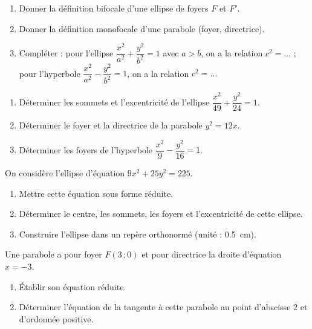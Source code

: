 \documentclass[11pt]{article}
\newcounter{popsec}
\newcounter{popsub}
\newcommand{\courssub}[1]{%
  \stepcounter{popsub}%
  \par\vspace{9pt}\noindent{\popxbold\fontsize{11.5}{13}\selectfont\color{popink}{\color{poporange}\thepopsec.\thepopsub}\hspace{6pt}#1}\par\nopagebreak\vspace{4pt}
}
\begin{document}
\begin{exercice}
\begin{enumerate}
\item Donner la définition bifocale d'une ellipse de foyers $F$ et $F'$.
\item Donner la définition monofocale d'une parabole (foyer, directrice).
\item Compléter : pour l'ellipse $\dfrac{x^{2}}{a^{2}}+\dfrac{y^{2}}{b^{2}}=1$ avec $a>b$, on a la relation $c^{2}=\ldots$ ; pour l'hyperbole $\dfrac{x^{2}}{a^{2}}-\dfrac{y^{2}}{b^{2}}=1$, on a la relation $c^{2}=\ldots$
\end{enumerate}
\end{exercice}

\begin{exercice}
\begin{enumerate}
\item Déterminer les sommets et l'excentricité de l'ellipse $\dfrac{x^{2}}{49}+\dfrac{y^{2}}{24}=1$.
\item Déterminer le foyer et la directrice de la parabole $y^{2}=12x$.
\item Déterminer les foyers de l'hyperbole $\dfrac{x^{2}}{9}-\dfrac{y^{2}}{16}=1$.
\end{enumerate}
\end{exercice}

\courssub{Je m'entraîne}

\begin{exercice}
On considère l'ellipse d'équation $9x^{2}+25y^{2}=225$.
\begin{enumerate}
\item Mettre cette équation sous forme réduite.
\item Déterminer le centre, les sommets, les foyers et l'excentricité de cette ellipse.
\item Construire l'ellipse dans un repère orthonormé (unité : \SI{0,5}{cm}).
\end{enumerate}
\end{exercice}

\begin{exercice}
Une parabole a pour foyer $F(3\,;0)$ et pour directrice la droite d'équation $x=-3$.
\begin{enumerate}
\item Établir son équation réduite.
\item Déterminer l'équation de la tangente à cette parabole au point d'abscisse $2$ et d'ordonnée positive.
\end{enumerate}
\end{exercice}
\end{document}
